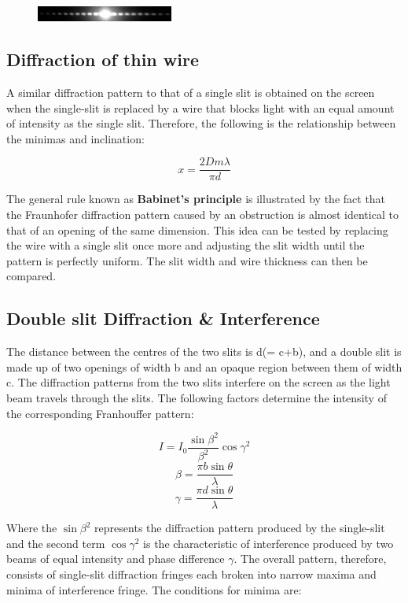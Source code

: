 		\begin{figure}[H]
			\centering
			\includegraphics[width=0.4\textwidth]{images/photo_1.png}
			\label{pic:1}
		\end{figure}

	\subsection{Diffraction of thin wire}
		A similar diffraction pattern to that of a single slit is obtained on the screen when the single-slit is replaced by a wire that blocks light with an equal amount of intensity as the single slit. Therefore, the following is the relationship between the minimas and inclination:

		\begin{equation}
			x = \frac{2Dm\lambda}{\pi d}
			\label{eqn:2}
		\end{equation}

		The general rule known as \textbf{Babinet's principle} is illustrated by the fact that the Fraunhofer diffraction pattern caused by an obstruction is almost identical to that of an opening of the same dimension. This idea can be tested by replacing the wire with a single slit once more and adjusting the slit width until the pattern is perfectly uniform. The slit width and wire thickness can then be compared.
	
	\subsection{Double slit Diffraction \& Interference}
		The distance between the centres of the two slits is d(= c+b), and a double slit is made up of two openings of width b and an opaque region between them of width c. The diffraction patterns from the two slits interfere on the screen as the light beam travels through the slits. The following factors determine the intensity of the corresponding Franhouffer pattern:

		$$I = I_0 \frac{\sin\beta^2}{\beta^2} \cos\gamma^2$$
		$$\beta = \frac{\pi b\sin\theta}{\lambda}$$
		$$\gamma = \frac{\pi d\sin\theta}{\lambda}$$

		Where the $\sin\beta^2$ represents the diffraction pattern produced by the single-slit and the second term $\cos\gamma^2$ is the characteristic of interference produced by two beams of equal intensity and phase difference $\gamma$. The overall pattern, therefore, consists of single-slit diffraction fringes each broken into narrow maxima and minima of interference fringe. The conditions for minima are:

